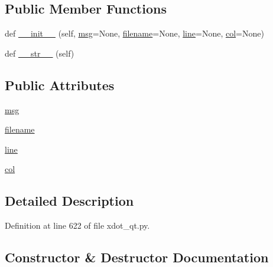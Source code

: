\subsection*{Public Member Functions}
\begin{DoxyCompactItemize}
\item 
def \hyperlink{classsmacc__viewer_1_1xdot_1_1xdot__qt_1_1ParseError_a645d9f1662fda29dff774b7f473f32c5}{\+\_\+\+\_\+init\+\_\+\+\_\+} (self, \hyperlink{classsmacc__viewer_1_1xdot_1_1xdot__qt_1_1ParseError_ad7085eae371cd4b0996ebbe3fb941290}{msg}=None, \hyperlink{classsmacc__viewer_1_1xdot_1_1xdot__qt_1_1ParseError_a9d525ed20879f49c2d61e807a982dbe1}{filename}=None, \hyperlink{classsmacc__viewer_1_1xdot_1_1xdot__qt_1_1ParseError_a7ffc812fac9ed30e9db6b5e1fdfd60b9}{line}=None, \hyperlink{classsmacc__viewer_1_1xdot_1_1xdot__qt_1_1ParseError_acacdd5b9b260b2cbe7532e952a0b84e2}{col}=None)
\item 
def \hyperlink{classsmacc__viewer_1_1xdot_1_1xdot__qt_1_1ParseError_ab820a0ea9418e53989b3d27eae6b3a40}{\+\_\+\+\_\+str\+\_\+\+\_\+} (self)
\end{DoxyCompactItemize}
\subsection*{Public Attributes}
\begin{DoxyCompactItemize}
\item 
\hyperlink{classsmacc__viewer_1_1xdot_1_1xdot__qt_1_1ParseError_ad7085eae371cd4b0996ebbe3fb941290}{msg}
\item 
\hyperlink{classsmacc__viewer_1_1xdot_1_1xdot__qt_1_1ParseError_a9d525ed20879f49c2d61e807a982dbe1}{filename}
\item 
\hyperlink{classsmacc__viewer_1_1xdot_1_1xdot__qt_1_1ParseError_a7ffc812fac9ed30e9db6b5e1fdfd60b9}{line}
\item 
\hyperlink{classsmacc__viewer_1_1xdot_1_1xdot__qt_1_1ParseError_acacdd5b9b260b2cbe7532e952a0b84e2}{col}
\end{DoxyCompactItemize}


\subsection{Detailed Description}


Definition at line 622 of file xdot\+\_\+qt.\+py.



\subsection{Constructor \& Destructor Documentation}
